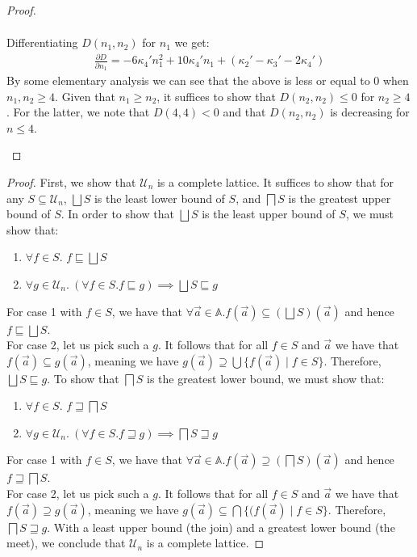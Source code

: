 \documentclass[10pt,a4paper]{article}
\theoremstyle{definition}
\theoremstyle{remark}
\newcommand\Ucal{\mathcal{U}}
\newcommand\Atoms{\mathbb{A}}
\begin{document}
\begin{proof}
\begin{enumerate}
\begin{align*}
\end{align*}
Differentiating $D(n_1,n_2)$ for $n_1$ we get:
\begin{align*}
\frac{\partial D}{\partial n_1}= -6\kappa_4'n_1^2+10\kappa_4'n_1+(\kappa_2'-\kappa_3'-2\kappa_4')
\end{align*}
By some elementary analysis we can see that the above is less or equal to 0 when $n_1,n_2\geq 4$. Given that $n_1\geq n_2$, it suffices to show that $D(n_2,n_2)\leq 0$ for $n_2\geq 4$. For the latter, we note that $D(4,4)< 0$ and that $D(n_2,n_2)$ is decreasing for $n\leq4$.
\end{enumerate}
\end{proof}


\completelattice*
\begin{proof}
	First, we show that $\Ucal_n$ is a complete lattice. 
	It suffices to show that for any $S\subseteq \Ucal_n$, $\bigsqcup S$ is the least lower bound of $S$, and $\bigsqcap S$ is the greatest upper bound of $S$. In order to show that $\bigsqcup S$ is the least upper bound of $S$, we must show that:
 \begin{enumerate}
		\item $\forall f\in S$. $f\sqsubseteq \bigsqcup S$
		\item $\forall g\in \Ucal_n.\ (\forall f\in S. f\sqsubseteq g)\implies\bigsqcup S \sqsubseteq g$
	\end{enumerate}
 	For case 1 with $f\in S$, we have that $\forall \vec a\in\Atoms. f(\vec a) \subseteq (\bigsqcup S)(\vec a)$
	and hence $f\sqsubseteq \bigsqcup S$.\\
	  	For case 2, let us pick such a $g$. It follows that for all $f\in S$ and $\vec a$ we have that $f(\vec a) \subseteq g(\vec a)$,
	meaning we have $g(\vec a) \supseteq \bigcup \{f(\vec a) \mid f \in S\}$.
	Therefore, $\bigsqcup S \sqsubseteq g$.
	To show that $\bigsqcap S$ is the greatest lower bound, we must show that:
	\begin{enumerate}
		\item $\forall f\in S$. $f\sqsupseteq \bigsqcap S$
		\item $\forall g\in \Ucal_n.\ (\forall f\in S. f\sqsupseteq g)\implies\bigsqcap S \sqsupseteq g$
	\end{enumerate}
	For case 1 with $f\in S$, we have that $\forall \vec a\in\Atoms. f(\vec a)\supseteq (\bigsqcap S)(\vec a)$ and hence $f\sqsupseteq \bigsqcap S$.\\
	For case 2, let us pick such a $g$. It follows that for all $f \in S$ and $\vec a$ we have that $f(\vec a)\supseteq g(\vec a)$, meaning we have $g(\vec a) \subseteq \bigcap\{(f(\vec a)\mid f \in S\}$. Therefore, $\bigsqcap S \sqsupseteq g$.     
	With a least upper bound (the join) and a greatest lower bound (the meet), we conclude that $\Ucal_n$ is a complete lattice. 
	

\end{proof}
\end{document}
